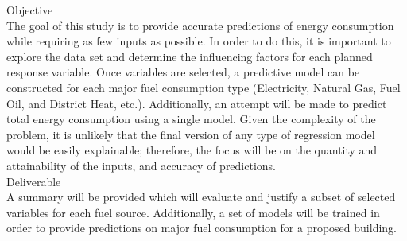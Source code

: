 {\Large {Objective}}
\\
The goal of this study is to provide accurate predictions of energy consumption while requiring as few inputs as possible.  In order to do this, it is important to explore the data set and determine the influencing factors for each planned response variable.  Once variables are selected, a predictive model can be constructed for each major fuel consumption type (Electricity, Natural Gas, Fuel Oil, and District Heat, etc.).  Additionally, an attempt will be made to predict total energy consumption using a single model.  Given the complexity of the problem, it is unlikely that the final version of any type of regression model would be easily explainable; therefore, the focus will be on the quantity and attainability of the inputs, and accuracy of predictions. 
\\[0.125in]
{\Large {Deliverable}}
\\
A summary will be provided which will evaluate and justify a subset of selected variables for each fuel source.  Additionally, a set of models will be trained in order to provide predictions on major fuel consumption for a proposed building.